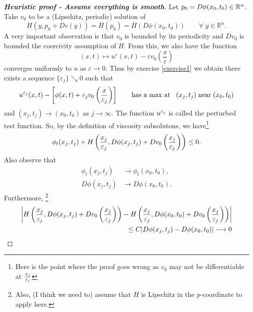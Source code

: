 \documentclass[12pt, oneside]{amsart}  	%
\begin{document}
\begin{proof}[\textbf{Heuristic proof - Assume everything is smooth}]\quad
Let $p_0=D\phi(x_0, t_0)\in \mathbb{R}^n$. Take $v_0$ to be a (Lipschitz, periodic) solution of
\begin{equation}\label{assume v is smooth solution of cell Ep0}
H(y, p_0 + Dv(y))=\overline{H}(p_0)=\overline{H}(D\phi(x_0, t_0))\qquad\forall\; y\in \mathbb{R}^n.
\end{equation}
A very important observation is that $v_0$ is bounded by its periodicity and $Dv_0$ is bounded the coercivity assumption of $H$. From this, we also have the function
\begin{equation*}
(x,t)\longmapsto  u^{\varepsilon}(x,t) - \varepsilon v_0\left(\frac{x}{\varepsilon}\right)
\end{equation*}
converges uniformly to $u$ as $\varepsilon\longrightarrow 0$. Thus by exercise \ref{exercise1} we obtain there exists a sequence $\{\varepsilon_j\} \searrow 0$ such that
\begin{equation}\label{heuristic-leq 0}
u^{\varepsilon_j}(x, t) -\left[ \phi(x, t) + \varepsilon_j v_0\left(\frac{x}{\varepsilon_j}\right)\right] \qquad\text{has a max at}\;\;\; (x_j, t_j)\;\text{near}\;(x_0,t_0)
\end{equation}
and $(x_j,t_j)\longrightarrow (x_0,t_0)$ as $j\longrightarrow \infty$. The function $u^{\varepsilon_j}$ is called the perturbed test function. So, by the definition of viscosity subsolutons, we have\footnote{Here is the point where the proof goes wrong as $v_0$ may not be differentiable at $\frac{x_j}{\varepsilon_j}$}
\begin{equation*}
\phi_t(x_j, t_j) + H\left(\frac{x_j}{\varepsilon_j}, D\phi(x_j, t_j) + Dv_0\left(\frac{x_j}{\varepsilon_j}\right)\right)\leq 0.
\end{equation*}
Also observe that 
\begin{align*}
\phi_t(x_j, t_j) &\longrightarrow \phi_t(x_0, t_0),\\
D\phi(x_j, t_j)&\longrightarrow  D\phi(x_0, t_0).
\end{align*}
Furthermore, \footnote{Also, (I think we need to) assume that $H$ is Lipschitz in the $p$-coordinate to apply here.}
\begin{align*}
\left|H\left(\frac{x_j}{\varepsilon_j}, D\phi(x_j, t_j) + Dv_0\left(\frac{x_j}{\varepsilon_j}\right)\right)-H\left(\frac{x_j}{\varepsilon_j}, D\phi(x_0, t_0) + Dv_0\left(\frac{x_j}{\varepsilon_j}\right)\right)\right| \\
\le C|D\phi(x_j, t_j) - D\phi(x_0, t_0)| \longrightarrow 0
\end{align*}

\end{proof}
\end{document}
